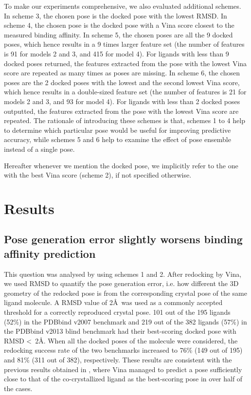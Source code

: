 \documentclass[twocolumn]{bmcart}
\begin{document}
To make our experiments comprehensive, we also evaluated additional schemes. In scheme 3, the chosen pose is the docked pose with the lowest RMSD. In scheme 4, the chosen pose is the docked pose with a Vina score closest to the measured binding affinity. In scheme 5, the chosen poses are all the 9 docked poses, which hence results in a 9 times larger feature set (the number of features is 91 for models 2 and 3, and 415 for model 4). For ligands with less than 9 docked poses returned, the features extracted from the pose with the lowest Vina score are repeated as many times as poses are missing. In scheme 6, the chosen poses are the 2 docked poses with the lowest and the second lowest Vina score, which hence results in a double-sized feature set (the number of features is 21 for models 2 and 3, and 93 for model 4). For ligands with less than 2 docked poses outputted, the features extracted from the pose with the lowest Vina score are repeated. The rationale of introducing these schemes is that, schemes 1 to 4 help to determine which particular pose would be useful for improving predictive accuracy, while schemes 5 and 6 help to examine the effect of pose ensemble instead of a single pose.

Hereafter whenever we mention the docked pose, we implicitly refer to the one with the best Vina score (scheme 2), if not specified otherwise.

\section*{Results}

\subsection*{Pose generation error slightly worsens binding affinity prediction}

This question was analysed by using schemes 1 and 2. After redocking by Vina, we used RMSD to quantify the pose generation error, i.e. how different the 3D geometry of the redocked pose is from the corresponding crystal pose of the same ligand molecule. A RMSD value of 2\AA\ was used as a commonly accepted threshold for a correctly reproduced crystal pose. 101 out of the 195 ligands (52\%) in the PDBbind v2007 benchmark and 219 out of the 382 ligands (57\%) in the PDBbind v2013 blind benchmark had their best-scoring docked pose with RMSD \textless\ 2\AA. When all the docked poses of the molecule were considered, the redocking success rate of the two benchmarks increased to 76\% (149 out of 195) and 81\% (311 out of 382), respectively. These results are consistent with the previous results obtained in \cite{1362}, where Vina managed to predict a pose sufficiently close to that of the co-crystallized ligand as the best-scoring pose in over half of the cases.
\end{document}
